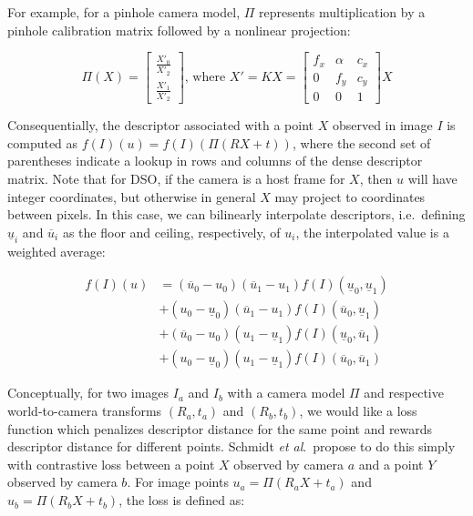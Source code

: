 For example, for a pinhole camera model, $\Pi$ represents multiplication by a pinhole calibration matrix followed by a nonlinear projection:

\begin{equation}
\Pi(X) = 
\begin{bmatrix}
	\frac{X'_0}{X'_2} \\
	\frac{X'_1}{X'_2}
\end{bmatrix}
\text{, where } X' = KX =
	\begin{bmatrix}
	f_x & \alpha & c_x \\
	0 & f_y & c_y \\
	0 & 0 & 1
	\end{bmatrix} X
\end{equation}

Consequentially, the descriptor associated with a point $X$ observed in image $I$ is computed as $f(I)(u) = f(I)(\Pi(RX + t))$, where the second set of parentheses indicate a lookup in rows and columns of the dense descriptor matrix. Note that for DSO, if the camera is a host frame for $X$, then $u$ will have integer coordinates, but otherwise in general $X$ may project to coordinates between pixels. In this case, we can bilinearly interpolate descriptors, i.e.\ defining $\underline{u}_i$ and $\overline{u}_i$ as the floor and ceiling, respectively, of $u_i$, the interpolated value is a weighted average:

\begin{equation}
\begin{aligned}
f(I)(u) &= (\overline{u}_0 - u_0) (\overline{u}_1 - u_1) f(I)(\underline{u}_0, \underline{u}_1) \\
        &+ (u_0 - \underline{u}_0) (\overline{u}_1 - u_1) f(I)(\overline{u}_0, \underline{u}_1) \\
        &+ (\overline{u}_0 - u_0) (u_1 - \underline{u}_1) f(I)(\underline{u}_0, \overline{u}_1) \\
        &+ (u_0 - \underline{u}_0) (u_1 - \underline{u}_1) f(I)(\overline{u}_0, \overline{u}_1)
\end{aligned}
\end{equation}

Conceptually, for two images $I_a$ and $I_b$ with a camera model $\Pi$ and respective world-to-camera transforms $(R_a, t_a)$ and $(R_b, t_b)$, we would like a loss function which penalizes descriptor distance for the same point and rewards descriptor distance for different points. Schmidt \textit{et al}.\ propose to do this simply with contrastive loss between a point $X$ observed by camera $a$ and a point $Y$ observed by camera $b$. For image points $u_a = \Pi(R_a X + t_a)$ and $u_b = \Pi(R_b X + t_b)$, the loss is defined as:

